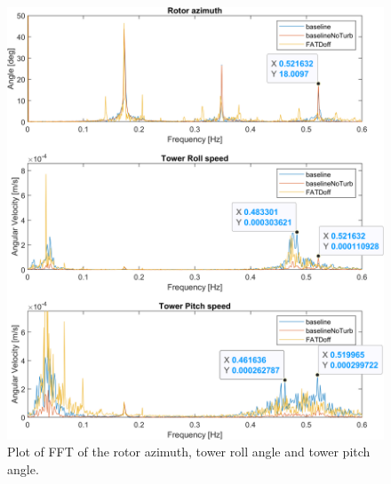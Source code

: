 \begin{figure}[ht]
	\centering
	\includegraphics[width=0.8\linewidth]{Graphics/TestResults/tj01/PSIxVelyVelFFT.png}
	\caption{Plot of FFT of the rotor azimuth, tower roll angle and tower pitch angle.}
	\label{fig:tj1_PSIxVelyVelFFT}
\end{figure}
